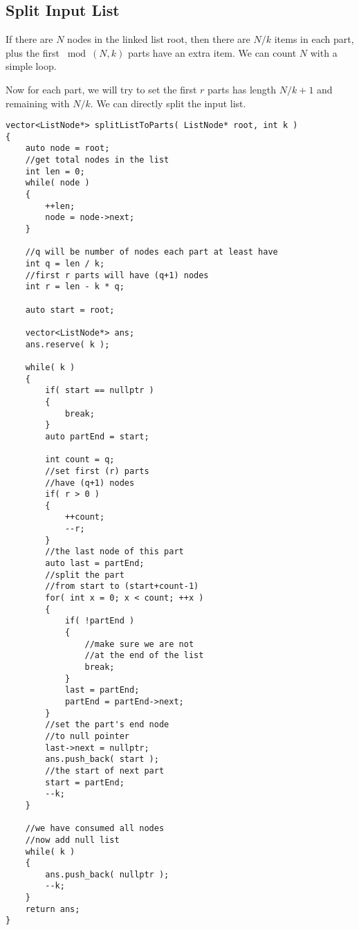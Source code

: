 \subsection{Split Input List}
If there are $N$ nodes in the linked list root, then there are $N / k$ items in each part, plus the first $\bmod(N, k)$ parts have an extra item. We can count $N$ with a simple loop.

Now for each part, we will try to set the first $r$ parts has length $N/k + 1$ and remaining with $N/k$. We can directly split the input list.

\setcounter{lstlisting}{0}
\begin{lstlisting}[style=customc, caption={Split Input List}]
vector<ListNode*> splitListToParts( ListNode* root, int k )
{
    auto node = root;
    //get total nodes in the list
    int len = 0;
    while( node )
    {
        ++len;
        node = node->next;
    }

    //q will be number of nodes each part at least have
    int q = len / k;
    //first r parts will have (q+1) nodes
    int r = len - k * q;

    auto start = root;

    vector<ListNode*> ans;
    ans.reserve( k );

    while( k )
    {
        if( start == nullptr )
        {
            break;
        }
        auto partEnd = start;

        int count = q;
        //set first (r) parts
        //have (q+1) nodes
        if( r > 0 )
        {
            ++count;
            --r;
        }
        //the last node of this part
        auto last = partEnd;
        //split the part
        //from start to (start+count-1)
        for( int x = 0; x < count; ++x )
        {
            if( !partEnd )
            {
                //make sure we are not
                //at the end of the list
                break;
            }
            last = partEnd;
            partEnd = partEnd->next;
        }
        //set the part's end node
        //to null pointer
        last->next = nullptr;
        ans.push_back( start );
        //the start of next part
        start = partEnd;
        --k;
    }

    //we have consumed all nodes
    //now add null list
    while( k )
    {
        ans.push_back( nullptr );
        --k;
    }
    return ans;
}
\end{lstlisting}

